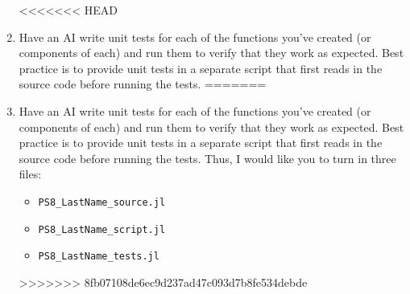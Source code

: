 \documentclass[12pt,english]{article}
\begin{document}
\begin{enumerate}
<<<<<<< HEAD
\item Have an AI write unit tests for each of the functions you've created (or components of each) and run them to verify that they work as expected. Best practice is to provide unit tests in a separate script that first reads in the source code before running the tests.
=======
\item Have an AI write unit tests for each of the functions you've created (or components of each) and run them to verify that they work as expected. Best practice is to provide unit tests in a separate script that first reads in the source code before running the tests. Thus, I would like you to turn in three files:
    \begin{itemize}
        \item \texttt{PS8\_LastName\_source.jl}
        \item \texttt{PS8\_LastName\_script.jl}
        \item \texttt{PS8\_LastName\_tests.jl}
    \end{itemize}
>>>>>>> 8fb07108de6ec9d237ad47c093d7b8fe534debde

\end{enumerate}
\end{document}
